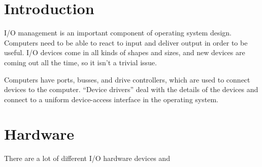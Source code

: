 \documentclass{article}
\begin{document}
\maketitle
\tableofcontents

\section{Introduction}
I/O management is an important component of operating system design. Computers
need to be able to react to input and deliver output in order to be useful.
I/O devices come in all kinds of shapes and sizes, and new devices are coming
out all the time, so it isn't a trivial issue.

Computers have ports, busses, and drive controllers, which are used to connect
devices to the computer. ``Device drivers'' deal with the details of the
devices and connect to a uniform device-access interface in the operating
system.

\section{Hardware}
There are a lot of different I/O hardware devices and 
\end{document}
